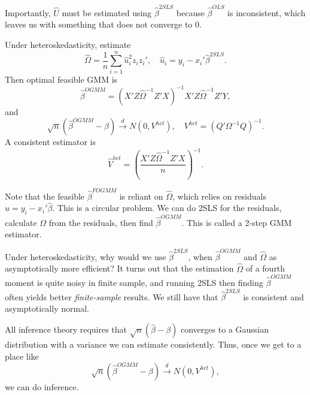 Importantly, $\hat{U}$ must be estimated using $\hat{\beta}^{2SLS}$ because $\hat{\beta}^{OLS}$ is inconsistent, which leaves us with something that does not converge to $0$. 

\begin{proposition}
	Under heteroskedasticity, estimate \[
		\hat{\Omega} = \frac{1}{n}\sum_{i=1}^{n}\hat{u}_i^2 z_i z_i', \quad \hat{u}_i = y_i - x_i'\hat{\beta}^{2SLS}
	.\]
	Then optimal feasible GMM is \[
		\hat{\beta}^{OGMM} = (X'Z\hat{\Omega}^{-1}Z'X)^{-1}X'Z\hat{\Omega}^{-1}Z'Y
	,\]
	and \[
		\sqrt{n}(\hat{\beta}^{OGMM}-\beta) \xrightarrow{d} N(0,V^{het}), \quad V^{het} = (Q'\Omega^{-1}Q)^{-1}
	.\]
	A consistent estimator is \[
		\hat{V}^{het} = \left(\frac{X'Z\hat{\Omega}^{-1}Z'X}{n}\right)^{-1}
	.\]
\end{proposition}

Note that the feasible $\hat{\beta}^{FOGMM}$ is reliant on $\hat{\Omega}$, which relies on residuals $\hat{u} = y_i - x_i' \hat{\beta}$. This is a circular problem. We can do 2SLS for the residuals, calculate $\Omega$ from the residuals, then find $\hat{\beta}^{OGMM}$.
This is called a 2-step GMM estimator.

Under heteroskedasticity, why would we use $\hat{\beta}^{2SLS}$, when $\hat{\beta}^{OGMM}$ and $\hat{\Omega}$ as asymptotically more efficient? It turns out that the estimation $\hat{\Omega}$ of a fourth moment is quite noisy in finite sample, and running 2SLS then finding $\hat{\beta}^{OGMM}$ often yields better \emph{finite-sample} results. We still have that $\hat{\beta}^{2SLS}$ is consistent and asymptotically normal.

All inference theory requires that $\sqrt{n} \left( \hat{\beta} - \beta \right)$ converges to a Gaussian distribution with a variance we can estimate consistently. Thus, once we get to a place like \[
	\sqrt{n} \left( \hat{\beta}^{OGMM}- \beta \right) \xrightarrow{d} N\left( 0, V^{het} \right)
,\] we can do inference.
